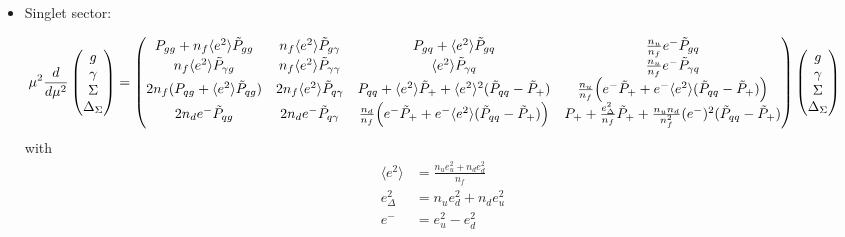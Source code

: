 \documentclass[a4paper,twoside]{article}
\title{}
\author{}
\date{}
\begin{document}
\maketitle
\begin{itemize}
\item Singlet sector:

\begin{equation*}
\hspace*{-0.4cm}\mu^2\frac{d}{d\mu^2}
\begin{pmatrix}
g \\
\gamma \\
\Sigma \\
\Delta_\Sigma
\end{pmatrix}
=
\begin{pmatrix}
 P_{gg}+n_f \langle e^2\rangle \tilde{P}_{gg} & n_f \langle e^2\rangle \tilde{P}_{g\gamma} & P_{gq} + \langle e^2\rangle \tilde{P}_{gq} & \frac{n_u}{n_f}e^- \tilde{P}_{gq} \\
 n_f \langle e^2\rangle \tilde{P}_{\gamma g} & n_f \langle e^2\rangle \tilde{P}_{\gamma \gamma} & \langle e^2\rangle \tilde{P}_{\gamma q} & \frac{n_u}{n_f}e^- \tilde{P}_{\gamma q} \\
 2n_f (P_{qg} +\langle e^2\rangle  \tilde{P}_{qg} )& 2 n_f \langle e^2\rangle  \tilde{P}_{q\gamma} & P_{qq}+ \langle e^2\rangle \tilde{P}_{+} + \langle e^2\rangle^2(\tilde{P}_{qq}-\tilde{P}_{+}) & \frac{n_u}{n_f}\Bigl(e^-\tilde{P}_{+}+ e^- \langle e^2\rangle (\tilde{P}_{qq}-\tilde{P}_{+}) \Bigr)\\
 2n_de^-\tilde{P}_{qg} & 2n_de^-\tilde{P}_{q\gamma} & \frac{n_d}{n_f}\Bigl(e^- \tilde{P}_{+} + e^- \langle e^2\rangle (\tilde{P}_{qq}-\tilde{P}_{+}) \Bigr)& P_+ +\frac{e_\Delta^2}{n_f}\tilde{P}_{+} +\frac{n_u n_d}{n_f^2}(e^-)^2(\tilde{P}_{qq}-\tilde{P}_{+})
\end{pmatrix}
\begin{pmatrix}
g \\
\gamma \\
\Sigma \\
\Delta_\Sigma
\end{pmatrix}
\end{equation*}
with
\begin{align*}
 \langle e^2\rangle&=\frac{n_u e_u^2+n_d e_d^2}{n_f} \\
e_\Delta^2&=n_u e_d^2+n_d e_u^2 \\
e^- &= e_u^2 -e_d^2
\end{align*}


\end{itemize}
\end{document}
